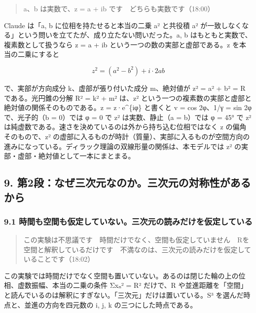 \documentclass[
  a4paper,
]{ltjsarticle}
\begin{document}
\begin{quote}
a、b は実数で、z = a + ib です　どちらも実数です（18:00）
\end{quote}

Claude は「a, b に位相を持たせると本当の二乗 a² と共役積
\textbar a\textbar²
が一致しなくなる」という問いを立てたが、成り立たない問いだった。a, b
はもともと実数で、複素数として扱うなら z = a + ib
という一つの数の実部と虚部である。z を本当の二乗にすると

\[
z^2=(a^2-b^2)+i\cdot2ab
\]

で、実部が方向成分 k、虚部が張り付いた成分 m、絶対値が
\textbar z²\textbar{} = a² + b² = R である。光円錐の分解 R² = k² + m²
は、z² という一つの複素数の実部と虚部と絶対値の関係そのものである。z =
\textbar z\textbar·e\^{}\{iφ\} と書くと v = cos 2φ、1/γ = sin 2φ
で、光子的（b = 0）では φ = 0 で z² は実数、静止（a = b）では φ = 45° で
z² は純虚数である。速さを決めているのは外から持ち込む位相ではなく z
の偏角そのもので、z²
の虚部に入るものが時計（質量）、実部に入るものが空間方向の進みになっている。ディラック理論の双線形量の関係は、本モデルでは
z² の実部・虚部・絶対値として一本にまとまる。

\subsection{9.
第2段：なぜ三次元なのか。三次元の対称性があるから}\label{ux7b2c2ux6bb5ux306aux305cux4e09ux6b21ux5143ux306aux306eux304bux4e09ux6b21ux5143ux306eux5bfeux79f0ux6027ux304cux3042ux308bux304bux3089}

\subsubsection{9.1
時間も空間も仮定していない。三次元の読みだけを仮定している}\label{ux6642ux9593ux3082ux7a7aux9593ux3082ux4eeeux5b9aux3057ux3066ux3044ux306aux3044ux4e09ux6b21ux5143ux306eux8aadux307fux3060ux3051ux3092ux4eeeux5b9aux3057ux3066ux3044ux308b}

\begin{quote}
この実験は不思議です　時間だけでなく、空間も仮定していません　Rを空間と解釈しているだけです　不満なのは、三次元の読みだけを仮定していることです（18:02）
\end{quote}

この実験では時間だけでなく空間も置いていない。あるのは閉じた輪の上の位相、虚数振幅、本当の二乗の条件
Σxₙ² = R² だけで、R
や並進距離を「空間」と読んでいるのは解釈にすぎない。「三次元」だけは置いている。S³
を選んだ時点と、並進の方向を四元数の i, j, k の三つにした時点である。
\end{document}
